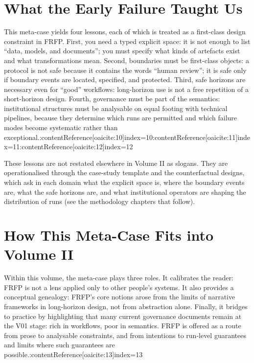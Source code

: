 \section{What the Early Failure Taught Us}

This meta-case yields four lessons, each of which is treated as a first-class design constraint in FRFP. First, you need a typed explicit space: it is not enough to list ``data, models, and documents''; you must specify what kinds of artefacts exist and what transformations mean. Second, boundaries must be first-class objects: a protocol is not safe because it contains the words ``human review''; it is safe only if boundary events are located, specified, and protected. Third, safe horizons are necessary even for ``good'' workflows: long-horizon use is not a free repetition of a short-horizon design. Fourth, governance must be part of the semantics: institutional structures must be analysable on equal footing with technical pipelines, because they determine which runs are permitted and which failure modes become systematic rather than exceptional.:contentReference[oaicite:10]{index=10}:contentReference[oaicite:11]{index=11}:contentReference[oaicite:12]{index=12}

These lessons are not restated elsewhere in Volume II as slogans. They are operationalised through the case-study template and the counterfactual designs, which ask in each domain what the explicit space is, where the boundary events are, what the safe horizons are, and what institutional operators are shaping the distribution of runs (see the methodology chapters that follow).

\section{How This Meta-Case Fits into Volume II}

Within this volume, the meta-case plays three roles. It calibrates the reader: FRFP is not a lens applied only to other people’s systems. It also provides a conceptual genealogy: FRFP’s core notions arose from the limits of narrative frameworks in long-horizon design, not from abstraction alone. Finally, it bridges to practice by highlighting that many current governance documents remain at the V01 stage: rich in workflows, poor in semantics. FRFP is offered as a route from prose to analysable constraints, and from intentions to run-level guarantees and limits where such guarantees are possible.:contentReference[oaicite:13]{index=13}

